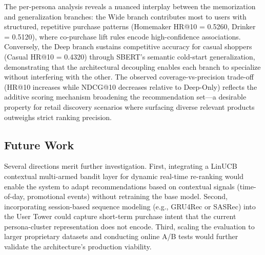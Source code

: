 \documentclass[10pt,conference]{IEEEtran}
\begin{document}
The per-persona analysis reveals a nuanced interplay between the memorization and generalization branches: the Wide branch contributes most to users with structured, repetitive purchase patterns (Homemaker HR@10 = 0.5260, Drinker = 0.5120), where co-purchase lift rules encode high-confidence associations. Conversely, the Deep branch sustains competitive accuracy for casual shoppers (Casual HR@10 = 0.4320) through SBERT's semantic cold-start generalization, demonstrating that the architectural decoupling enables each branch to specialize without interfering with the other. The observed coverage-vs-precision trade-off (HR@10 increases while NDCG@10 decreases relative to Deep-Only) reflects the additive scoring mechanism broadening the recommendation set---a desirable property for retail discovery scenarios where surfacing diverse relevant products outweighs strict ranking precision.

\subsection{Future Work}

Several directions merit further investigation. First, integrating a LinUCB contextual multi-armed bandit layer for dynamic real-time re-ranking would enable the system to adapt recommendations based on contextual signals (time-of-day, promotional events) without retraining the base model. Second, incorporating session-based sequence modeling (e.g., GRU4Rec or SASRec) into the User Tower could capture short-term purchase intent that the current persona-cluster representation does not encode. Third, scaling the evaluation to larger proprietary datasets and conducting online A/B tests would further validate the architecture's production viability.

\clearpage


\end{document}
